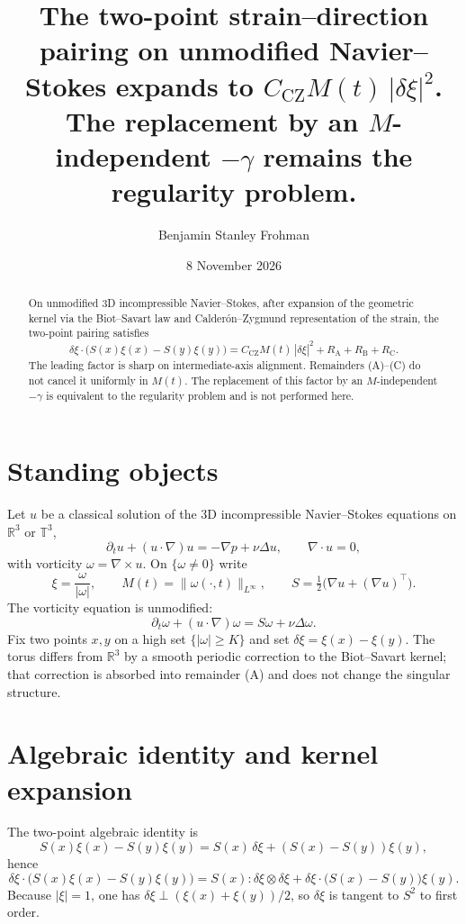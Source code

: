 \documentclass[11pt]{article}
\title{The two-point strain--direction pairing on unmodified Navier--Stokes expands to \( C_{\mathrm{CZ}} M(t)\,|\delta\xi|^2 \). The replacement by an \( M \)-independent \( -\gamma \) remains the regularity problem.}
\author{Benjamin Stanley Frohman}
\date{8 November 2026}
\begin{document}
\maketitle

\begin{abstract}
On unmodified 3D incompressible Navier--Stokes, after expansion of the geometric kernel via the Biot--Savart law and Calder\'on--Zygmund representation of the strain, the two-point pairing satisfies
\[
\delta\xi\cdot\bigl(S(x)\xi(x)-S(y)\xi(y)\bigr)=C_{\mathrm{CZ}}M(t)\,|\delta\xi|^2+R_{\mathrm{A}}+R_{\mathrm{B}}+R_{\mathrm{C}}.
\]
The leading factor is sharp on intermediate-axis alignment. Remainders (A)--(C) do not cancel it uniformly in \( M(t) \). The replacement of this factor by an \( M \)-independent \( -\gamma \) is equivalent to the regularity problem and is not performed here.
\end{abstract}

\section{Standing objects}
Let \( u \) be a classical solution of the 3D incompressible Navier--Stokes equations on \( \mathbb{R}^3 \) or \( \mathbb{T}^3 \),
\[
\partial_t u+(u\cdot\nabla)u=-\nabla p+\nu\Delta u,\qquad\nabla\cdot u=0,
\]
with vorticity \( \omega=\nabla\times u \). On \( \{\omega\neq 0\} \) write
\[
\xi=\frac{\omega}{|\omega|},\qquad M(t)=\|\omega(\cdot,t)\|_{L^\infty},\qquad S=\tfrac12\bigl(\nabla u+(\nabla u)^\top\bigr).
\]
The vorticity equation is unmodified:
\[
\partial_t\omega+(u\cdot\nabla)\omega=S\omega+\nu\Delta\omega.
\]
Fix two points \( x,y \) on a high set \( \{|\omega|\ge K\} \) and set \( \delta\xi=\xi(x)-\xi(y) \). The torus differs from \( \mathbb{R}^3 \) by a smooth periodic correction to the Biot--Savart kernel; that correction is absorbed into remainder (A) and does not change the singular structure.

\section{Algebraic identity and kernel expansion}
The two-point algebraic identity is
\[
S(x)\xi(x)-S(y)\xi(y)=S(x)\,\delta\xi+(S(x)-S(y))\xi(y),
\]
hence
\begin{equation}
\delta\xi\cdot\bigl(S(x)\xi(x)-S(y)\xi(y)\bigr)=S(x):\delta\xi\otimes\delta\xi+\delta\xi\cdot\bigl(S(x)-S(y)\bigr)\xi(y). \tag{\(\dagger\)}
\end{equation}
Because \( |\xi|=1 \), one has \( \delta\xi\perp(\xi(x)+\xi(y))/2 \), so \( \delta\xi \) is tangent to \( S^2 \) to first order.
\end{document}
